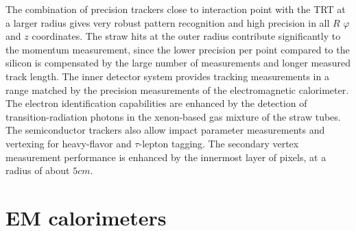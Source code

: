 The combination of precision trackers close to interaction point with the TRT at a larger radius gives very
robust pattern recognition and high precision in all $R$ $\varphi$ and $z$ coordinates. The straw hits at the
outer radius contribute significantly to the momentum measurement, since the lower precision per
point compared to the silicon is compensated by the large number of measurements and longer
measured track length.
The inner detector system provides tracking measurements in a range matched by the precision measurements of the electromagnetic calorimeter. The electron identification capabilities
are enhanced by the detection of transition-radiation photons in the xenon-based gas mixture of
the straw tubes. The semiconductor trackers also allow impact parameter measurements and vertexing for heavy-flavor and $\tau$-lepton tagging. The secondary vertex measurement performance is enhanced by the innermost layer of pixels, at a radius of about $5 cm$.


\section{EM calorimeters}
\label{sec:ATLAS_EM_calo}

\begin{figure}
\end{figure}


